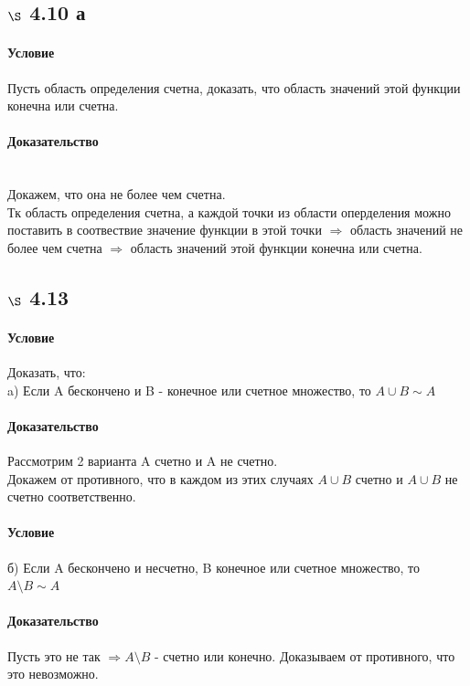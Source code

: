 \documentclass[a4paper,12pt]{article}
\begin{document}
\subsection*{$\S$ 4.10 а}
\paragraph*{Условие}
Пусть область определения счетна, доказать, что область значений этой функции конечна или счетна. \paragraph*{Доказательство}\mbox{}\\
Докажем, что она не более чем счетна.\\
Тк область определения счетна, а каждой точки из области оперделения можно поставить в соотвествие значение функции в этой точки $\Rightarrow$ область значений не более чем счетна $\Rightarrow$ область значений этой функции конечна или счетна.\\

\subsection*{$\S$ 4.13}
\paragraph*{Условие}
Доказать, что:\\
a) Если A бескончено и B - конечное или счетное множество, то $ A \cup B \sim A$
\paragraph*{Доказательство}
Рассмотрим 2 варианта A счетно и A не счетно.\\
Докажем от противного, что в каждом из этих случаях $A \cup B$ счетно и $A \cup B$  не счетно соответственно.
\paragraph*{Условие}
б) Если A бескончено и несчетно, B конечное или счетное множество, то $ A \setminus B \sim A$
\paragraph*{Доказательство}
Пусть это не так $\Rightarrow A \setminus B$ - счетно или конечно. Доказываем от противного, что это невозможно.
\end{document}
